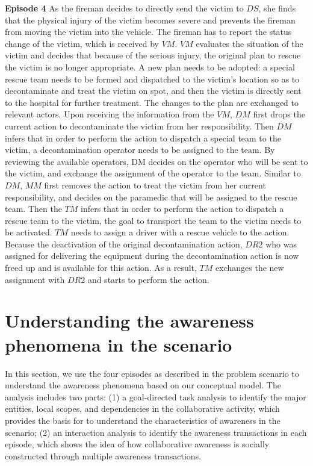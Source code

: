 \begin{scenario}
\footnotesize
\textbf{Episode 4} As the fireman decides to directly send the victim to $DS$, she finds that the physical injury of the victim becomes severe and prevents the fireman from moving the victim into the vehicle. The fireman has to report the status change of the victim, which is received by $VM$. $VM$ evaluates the situation of the victim and decides that because of the serious injury, the original plan to rescue the victim is no longer appropriate. A new plan needs to be adopted: a special rescue team needs to be formed and dispatched to the victim's location so as to decontaminate and treat the victim on spot, and then the victim is directly sent to the hospital for further treatment. The changes to the plan are exchanged to relevant actors. Upon receiving the information from the $VM$, $DM$ first drops the current action to decontaminate the victim from her responsibility. Then $DM$ infers that in order to perform the action to dispatch a special team to the victim, a decontamination operator needs to be assigned to the team. By reviewing the available operators, DM decides on the operator who will be sent to the victim, and exchange the assignment of the operator to the team. Similar to $DM$, $MM$ first removes the action to treat the victim from her current responsibility, and decides on the paramedic that will be assigned to the rescue team. Then the $TM$ infers that in order to perform the action to dispatch a rescue team to the victim, the goal to transport the team to the victim needs to be activated. $TM$ needs to assign a driver with a rescue vehicle to the action. Because the deactivation of the original decontamination action, $DR2$ who was assigned for delivering the equipment during the decontamination action is now freed up and is available for this action. As a result, $TM$ exchanges the new assignment with $DR2$ and starts to perform the action.
\end{scenario}

\section{Understanding the awareness phenomena in the scenario} %
\label{sec:understanding_the_awareness_phenomena_in_the_scenario}
In this section, we use the four episodes as described in the problem scenario to understand the awareness phenomena based on our conceptual model. The analysis includes two parts: (1) a goal-directed task analysis to identify the major entities, local scopes, and dependencies in the collaborative activity, which provides the basis for to understand the characteristics of awareness in the scenario; (2) an interaction analysis to identify the awareness transactions in each episode, which shows the idea of how collaborative awareness is socially constructed through multiple awareness transactions. 

